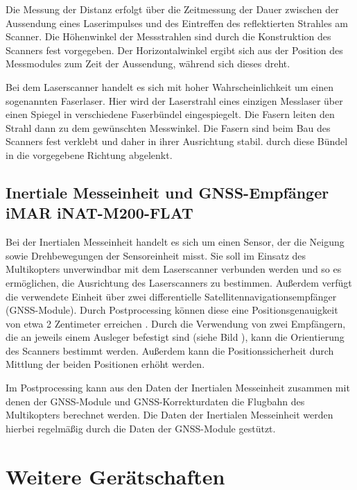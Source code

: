 \documentclass[a4paper,12pt,bibliography=totoc, listof=totoc,titlepage]{scrreprt}
\begin{document}
Die Messung der Distanz erfolgt über die Zeitmessung der Dauer zwischen der Aussendung eines Laserimpulses und des Eintreffen des reflektierten Strahles am Scanner. Die Höhenwinkel der Messstrahlen sind durch die Konstruktion des Scanners fest vorgegeben. Der Horizontalwinkel ergibt sich aus der Position des Messmodules zum Zeit der Aussendung, während sich dieses dreht.

Bei dem Laserscanner handelt es sich mit hoher Wahrscheinlichkeit um einen sogenannten Faserlaser. Hier wird der Laserstrahl eines einzigen Messlaser über einen Spiegel in verschiedene Faserbündel eingespiegelt. Die Fasern leiten den Strahl dann zu dem gewünschten Messwinkel. Die Fasern sind beim Bau des Scanners fest verklebt und daher in ihrer Ausrichtung stabil. durch diese Bündel in die vorgegebene Richtung abgelenkt. \citep[S. 18]{beraldin}


\subsection{Inertiale Messeinheit und GNSS-Empfänger iMAR iNAT-M200-FLAT}
\label{IMU}
Bei der Inertialen Messeinheit handelt es sich um einen Sensor, der die Neigung sowie Drehbewegungen der Sensoreinheit misst. Sie soll im Einsatz des Multikopters unverwindbar mit dem Laserscanner verbunden werden und so es ermöglichen, die Ausrichtung des Laserscanners zu bestimmen. Außerdem verfügt die verwendete Einheit über zwei differentielle Satellitennavigationsempfänger (GNSS-Module). Durch Postprocessing können diese eine Positionsgenauigkeit von etwa 2 Zentimeter erreichen \citep{imar}. Durch die Verwendung von zwei Empfängern, die an jeweils einem Ausleger befestigt sind (siehe Bild ), kann die Orientierung des Scanners bestimmt werden. Außerdem kann die Positionssicherheit durch Mittlung der beiden Positionen erhöht werden.

Im Postprocessing kann aus den Daten der Inertialen Messeinheit zusammen mit denen der GNSS-Module und GNSS-Korrekturdaten die Flugbahn des Multikopters berechnet werden. Die Daten der Inertialen Messeinheit werden hierbei regelmäßig durch die Daten der GNSS-Module gestützt.

\section {Weitere Gerätschaften}
\end{document}
